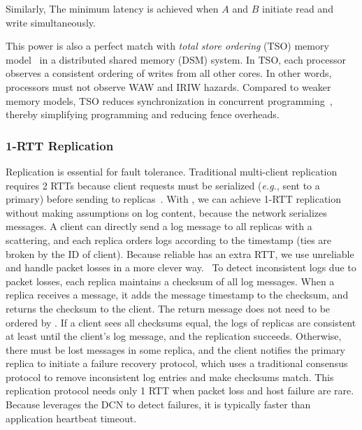 Similarly,  The minimum latency is achieved when $A$ and $B$ initiate read and write simultaneously.

This power is also a perfect match with \textit{total store ordering} (TSO) memory model~\cite{sewell2010x86} in a distributed shared memory (DSM) system. In TSO, each processor observes a consistent ordering of writes from all other cores. In other words, processors must not observe WAW and IRIW hazards.
Compared to weaker memory models, TSO reduces synchronization in concurrent programming~\cite{morrison2013fast,tassarotti2015verifying}, thereby simplifying programming and reducing fence overheads.

\subsubsection{1-RTT Replication}
\label{sec:replication}


Replication is essential for fault tolerance.
Traditional multi-client replication requires 2 RTTs because client requests must be serialized (\textit{e.g.}, sent to a primary) before sending to replicas~\cite{park2019exploiting}.
With \sys{}, we can achieve 1-RTT replication without making assumptions on log content, because the network serializes messages.
A client can directly send a log message to all replicas with a scattering, and each replica orders logs according to the timestamp (ties are broken by the ID of client).
Because reliable \sys{} has an extra RTT, we use unreliable \sys{} and handle packet losses in a more clever way.~
To detect inconsistent logs due to packet losses, each replica maintains a checksum of all  log messages. When a replica receives a message, it adds the message timestamp to the checksum, and returns the checksum to the client. The return message does not need to be ordered by \sys{}. If a client sees all checksums equal, the logs of replicas are consistent at least until the client's log message, and the replication succeeds. Otherwise, there must be lost messages in some replica, and the client notifies the primary replica to initiate a failure recovery protocol, which uses a traditional consensus protocol to remove inconsistent log entries and make checksums match. This replication protocol needs only 1 RTT when packet loss and host failure are rare. Because \sys{} leverages the DCN to detect failures, it is typically faster than application heartbeat timeout.~


